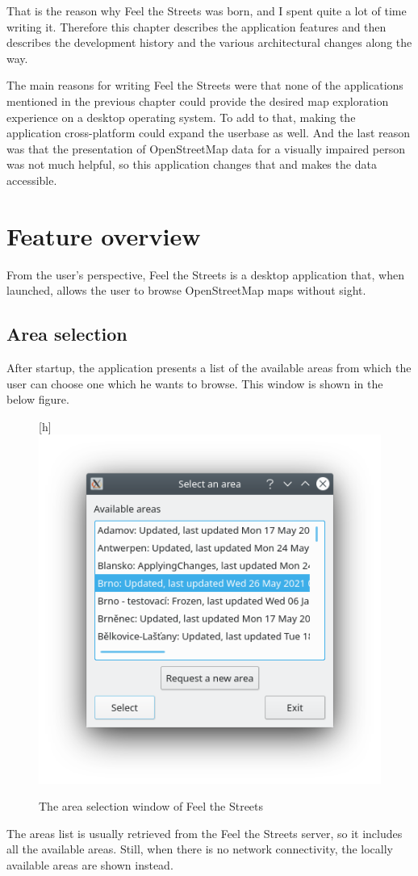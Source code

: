 \documentclass[nolof,digital]{fithesis3}
\begin{document}
That is the reason why Feel the Streets was born, and I spent quite a lot of time writing it. Therefore this chapter describes the application features and then describes the development history and the various architectural changes along the way.

The main reasons for writing Feel the Streets were that none of the applications mentioned in the previous chapter could provide the desired map exploration experience on a desktop operating system. To add to that, making the application cross-platform could expand the userbase as well. And the last reason was that the presentation of OpenStreetMap data for a visually impaired person was not much helpful, so this application changes that and makes the data accessible.
\section{Feature overview}
From the user's perspective, Feel the Streets is a desktop application that, when launched, allows the user to browse OpenStreetMap maps without sight.
\subsection{Area selection}
After startup, the application presents a list of the available areas from which the user can choose one which he wants to browse. This window is shown in the below figure.
\begin{figure}[h]
\caption{The area selection window of Feel the Streets}[h]
\includegraphics{fts-areas}
\end{figure}
The areas list is usually retrieved from the Feel the Streets server, so it includes all the available areas. Still, when there is no network connectivity, the locally available areas are shown instead.
\end{document}
